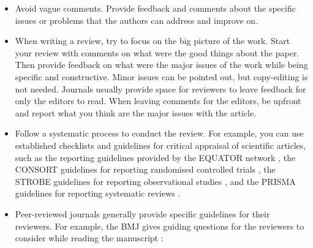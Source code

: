 \documentclass[
]{book}
\begin{document}
\begin{itemize}
\item
  Avoid vague comments. Provide feedback and comments about the specific issues or problems that the authors can address and improve on.
\item
  When writing a review, try to focus on the big picture of the work. Start your review with comments on what were the good things about the paper. Then provide feedback on what were the major issues of the work while being specific and constructive. Minor issues can be pointed out, but copy-editing is not needed. Journals usually provide space for reviewers to leave feedback for only the editors to read. When leaving comments for the editors, be upfront and report what you think are the major issues with the article.
\item
  Follow a systematic process to conduct the review. For example, you can use established checklists and guidelines for critical appraisal of scientific articles, such as the reporting guidelines provided by the EQUATOR network \citep{altman2008equator}, the CONSORT guidelines for reporting randomised controlled trials \citep{schulz2010consort}, the STROBE guidelines for reporting observational studies \citep{von2007strengthening}, and the PRISMA guidelines for reporting systematic reviews \citep{page2021prisma}.
\item
  Peer-reviewed journals generally provide specific guidelines for their reviewers. For example, the BMJ gives guiding questions for the reviewers to consider while reading the manuscript \citep{theBMJ2021resources}:


\end{itemize}
\end{document}
